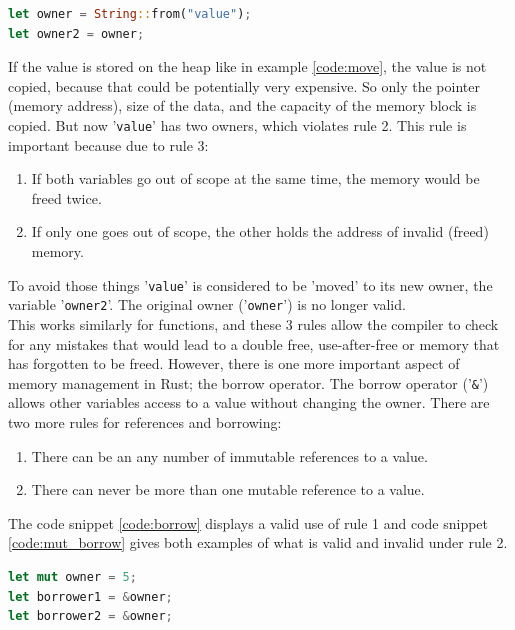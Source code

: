 \begin{lstlisting}[style=colorEX,language=Rust,caption={Simple example of a move},label={code:move}]
let owner = String::from("value");
let owner2 = owner;
\end{lstlisting}

If the value is stored on the heap like in example \ref{code:move}, the value is not copied, because that could
be potentially very expensive.
So only the pointer (memory address), size of the data, and the capacity of the memory block is copied.
But now '\lstinline{value}' has two owners, which violates rule 2.
This rule is important because due to rule 3:
\begin{enumerate}
    \item If both variables go out of scope at the same time, the memory would be freed twice.
    \item If only one goes out of scope, the other holds the address of invalid (freed) memory.
\end{enumerate}
To avoid those things '\lstinline{value}' is considered to be 'moved' to its new owner, the variable '\lstinline{owner2}'.
The original owner ('\lstinline{owner}') is no longer valid.\\
This works similarly for functions, and these 3 rules allow the compiler to check for any mistakes that would lead to
a double free, use-after-free or memory that has forgotten to be freed.
However, there is one more important aspect of memory management in Rust; the borrow operator.
The borrow operator ('\lstinline{&}') \cite{rust_borrow} allows other variables access to a value without changing the owner.
There are two more rules for references and borrowing:
\begin{enumerate}
    \item There can be an any number of immutable references to a value.
    \item There can never be more than one mutable reference to a value.
\end{enumerate}
The code snippet \ref{code:borrow} displays a valid use of rule 1 and code snippet \ref{code:mut_borrow} gives both examples
of what is valid and invalid under rule 2.

\begin{lstlisting}[style=colorEX,language=Rust,caption={Simple example of an immutable borrow},label={code:borrow}]
let mut owner = 5;
let borrower1 = &owner;
let borrower2 = &owner;
\end{lstlisting}

